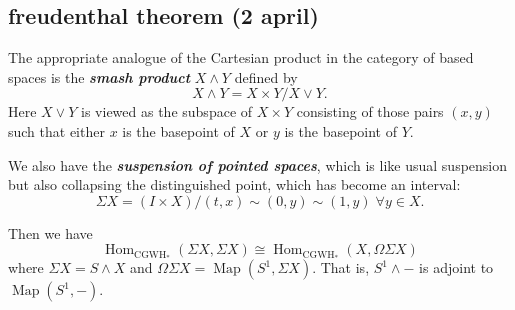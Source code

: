 \documentclass{article}
\DeclareMathOperator{\CGWH}{CGWH}
\DeclareMathOperator{\Hom}{Hom}
\DeclareMathOperator{\Map}{Map}
\begin{document}
\subsection{freudenthal theorem (2 april)}
\begin{defn}
	The appropriate analogue of the Cartesian product in the category of based spaces is the \textbf{\textit{smash product}} $X\wedge Y$ defined by
	\[X\wedge Y=X\times Y/X\vee Y.\]
	Here $X\vee Y$ is viewed as the subspace of $X\times Y$ consisting of those pairs $(x,y)$ such that either $x$ is the basepoint of $X$ or $y$ is the basepoint of $Y$.
\end{defn}
We also have the \textbf{\textit{suspension of pointed spaces}}, which is like usual suspension but also collapsing the distinguished point, which has become an interval:
\[\Sigma X=(I\times X)/(t,x)\sim (0,y)\sim (1,y)\;\forall y\in X.\]


Then we have
\[\Hom_{\CGWH_*}(\Sigma X,\Sigma X)\cong\Hom_{\CGWH_*}(X,\Omega\Sigma X)\]
where $\Sigma X=S\wedge X$ and $\Omega\Sigma X=\Map(S^1,\Sigma X)$. That is, $S^1\wedge-$ is adjoint to $\Map(S^1,-)$.
\end{document}
